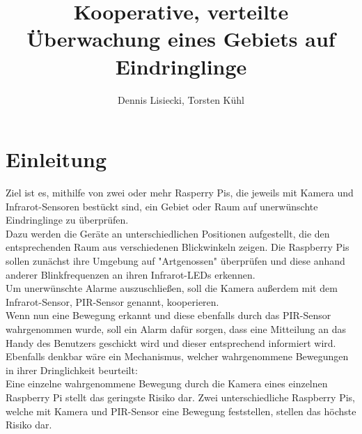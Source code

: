 \documentclass[9pt,a4paper]{IEEEtran}
\title{Kooperative, verteilte Überwachung eines Gebiets auf Eindringlinge}		%
\author{Dennis Lisiecki, Torsten Kühl}								%
\begin{document}

\maketitle	%




\section{Einleitung}
Ziel ist es, mithilfe von zwei oder mehr Rasperry Pis, die jeweils mit Kamera und Infrarot-Sensoren bestückt sind, ein Gebiet oder Raum auf unerwünschte Eindringlinge zu überprüfen.\\
Dazu werden die Geräte an unterschiedlichen Positionen aufgestellt, die den entsprechenden Raum aus verschiedenen Blickwinkeln zeigen. 
Die Raspberry Pis sollen zunächst ihre Umgebung auf "Artgenossen" überprüfen und diese anhand anderer Blinkfrequenzen an ihren Infrarot-LEDs erkennen. \\
Um unerwünschte Alarme auszuschließen, soll die Kamera außerdem mit dem Infrarot-Sensor, PIR-Sensor genannt, kooperieren. \\
Wenn nun eine Bewegung erkannt und diese ebenfalls durch das PIR-Sensor wahrgenommen wurde, soll ein Alarm dafür sorgen, dass eine Mitteilung an das Handy des Benutzers geschickt wird und dieser entsprechend informiert wird.\\
Ebenfalls denkbar wäre ein Mechanismus, welcher wahrgenommene Bewegungen in ihrer Dringlichkeit beurteilt:\\
Eine einzelne wahrgenommene Bewegung durch die Kamera eines einzelnen Raspberry Pi stellt das geringste Risiko dar.
Zwei unterschiedliche Raspberry Pis, welche mit Kamera und PIR-Sensor eine Bewegung feststellen, stellen das höchste Risiko dar.
\end{document}
